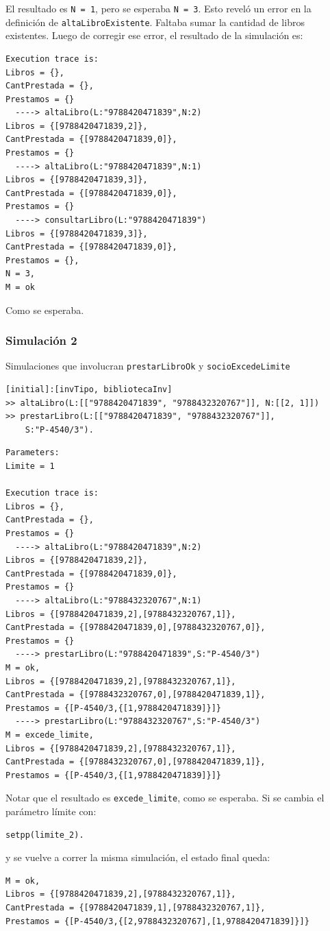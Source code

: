 \documentclass{article}
\begin{document}
El resultado es \texttt{N = 1}, pero se esperaba \texttt{N = 3}.
Esto reveló un error en la definición de \texttt{altaLibroExistente}. Faltaba sumar la cantidad de libros existentes.
Luego de corregir ese error, el resultado de la simulación es:

\begin{verbatim}
Execution trace is:
Libros = {},  
CantPrestada = {},  
Prestamos = {}
  ----> altaLibro(L:"9788420471839",N:2)
Libros = {[9788420471839,2]},  
CantPrestada = {[9788420471839,0]},  
Prestamos = {}
  ----> altaLibro(L:"9788420471839",N:1)
Libros = {[9788420471839,3]},  
CantPrestada = {[9788420471839,0]},  
Prestamos = {}
  ----> consultarLibro(L:"9788420471839")
Libros = {[9788420471839,3]},  
CantPrestada = {[9788420471839,0]},  
Prestamos = {},  
N = 3,  
M = ok
\end{verbatim}

Como se esperaba.

\subsubsection*{Simulación 2}
Simulaciones que involucran \texttt{prestarLibroOk} y \texttt{socioExcedeLimite}
\begin{verbatim}
[initial]:[invTipo, bibliotecaInv] 
>> altaLibro(L:[["9788420471839", "9788432320767"]], N:[[2, 1]]) 
>> prestarLibro(L:[["9788420471839", "9788432320767"]],
    S:"P-4540/3").
\end{verbatim}

\begin{verbatim}
Parameters:
Limite = 1

Execution trace is:
Libros = {},  
CantPrestada = {},  
Prestamos = {}
  ----> altaLibro(L:"9788420471839",N:2)
Libros = {[9788420471839,2]},  
CantPrestada = {[9788420471839,0]},  
Prestamos = {}
  ----> altaLibro(L:"9788432320767",N:1)
Libros = {[9788420471839,2],[9788432320767,1]},  
CantPrestada = {[9788420471839,0],[9788432320767,0]},  
Prestamos = {}
  ----> prestarLibro(L:"9788420471839",S:"P-4540/3")
M = ok,  
Libros = {[9788420471839,2],[9788432320767,1]},  
CantPrestada = {[9788432320767,0],[9788420471839,1]},  
Prestamos = {[P-4540/3,{[1,9788420471839]}]}
  ----> prestarLibro(L:"9788432320767",S:"P-4540/3")
M = excede_limite,  
Libros = {[9788420471839,2],[9788432320767,1]},  
CantPrestada = {[9788432320767,0],[9788420471839,1]},  
Prestamos = {[P-4540/3,{[1,9788420471839]}]}
\end{verbatim}

Notar que el resultado es \texttt{excede\_limite}, como se esperaba. Si se cambia el parámetro límite con:
\begin{verbatim}
setpp(limite_2).
\end{verbatim}
y se vuelve a correr la misma simulación, el estado final queda:
\begin{verbatim}
M = ok,  
Libros = {[9788420471839,2],[9788432320767,1]},  
CantPrestada = {[9788420471839,1],[9788432320767,1]},  
Prestamos = {[P-4540/3,{[2,9788432320767],[1,9788420471839]}]}
\end{verbatim}
\end{document}
